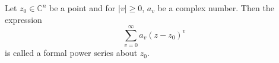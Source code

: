Let $z_0 \in \mathbb{C}^n$ be a point and for $|v| \geqslant 0$, $a_v$ be a complex number. Then the expression
$$\sum_{v=0}^{\infty} a_v(z - z_0)^v$$
is called a formal power series about $z_0$.
